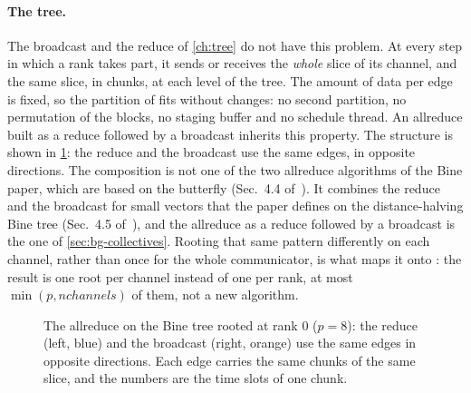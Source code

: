 \paragraph{The tree.}
The broadcast and the reduce of \cref{ch:tree} do not have this problem.
At every step in which a rank takes part, it sends or receives the \emph{whole} slice of its channel, and the same slice, in chunks, at each level of the tree.
The amount of data per edge is fixed, so the partition of \nccl{} fits without changes: no second partition, no permutation of the blocks, no staging buffer and no schedule thread.
An allreduce built as a reduce followed by a broadcast inherits this property.
The structure is shown in \cref{fig:tar-tree}: the reduce and the broadcast use the same edges, in opposite directions.
The composition is not one of the two allreduce algorithms of the Bine paper, which are based on the butterfly (Sec.~4.4 of~\cite{desensi2025bine}). It combines the reduce and the broadcast for small vectors that the paper defines on the distance-halving Bine tree (Sec.~4.5 of~\cite{desensi2025bine}), and the allreduce as a reduce followed by a broadcast is the one of \cref{sec:bg-collectives}.
Rooting that same pattern differently on each channel, rather than once for the whole communicator, is what maps it onto \nccl{}: the result is one root per channel instead of one per rank, at most $\min(p,\mathit{nchannels})$ of them, not a new algorithm.
\begin{figure}[t]
  \centering
  \hfill
  \caption{The allreduce on the Bine tree rooted at rank $0$ ($p=8$): the reduce
           (left, blue) and the broadcast (right, orange) use the same edges in opposite
           directions. Each edge carries the same chunks of the same slice, and the
           numbers are the time slots of one chunk.}
  \label{fig:tar-tree}
\end{figure}
